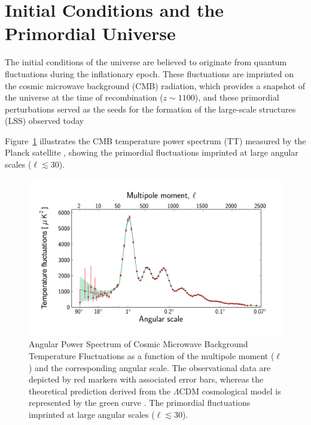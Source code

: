 \section{Initial Conditions and the Primordial Universe}
\label{sec:initial_conditions}
The initial conditions of the universe are believed to originate from quantum fluctuations during the inflationary epoch. These fluctuations are imprinted on the cosmic microwave background (CMB) radiation, which provides a snapshot of the universe at the time of recombination ($z \sim 1100$), and these primordial perturbations served as the seeds for the formation of the large-scale structures (LSS) observed today

Figure~\ref{fig:cmb_power_spectrum} illustrates the CMB temperature power spectrum (TT) measured by the Planck satellite \citep{2014A&A...571A..15P}, showing the primordial fluctuations imprinted at large angular scales (\( \ell \lesssim 30 \)).
\begin{figure}[ht]
    \centering
    \includegraphics[width=\textwidth]{figures/Planck_power_spectrum.jpg}
    \caption[Angular Power Spectrum (TT) of CMB Anisotropy]{Angular Power Spectrum of Cosmic Microwave Background Temperature Fluctuations as a function of the multipole moment (\( \ell \)) and the corresponding angular scale. The observational data are depicted by red markers with associated error bars, whereas the theoretical prediction derived from the \(\Lambda\)CDM cosmological model is represented by the green curve \citep{2014A&A...571A..15P}. The primordial fluctuations imprinted at large angular scales (\( \ell \lesssim 30 \)).
    }
    \label{fig:cmb_power_spectrum}
\end{figure}

